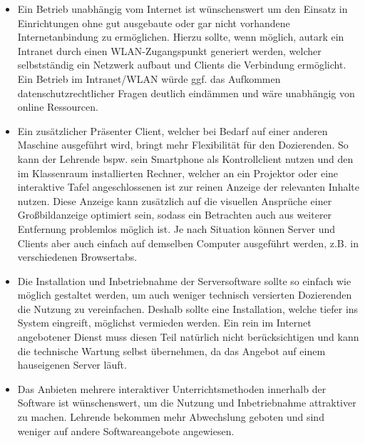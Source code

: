 \begin{itemize}
	\item Ein Betrieb unabhängig vom Internet ist wünschenswert um den Einsatz in Einrichtungen ohne gut ausgebaute oder gar nicht vorhandene Internetanbindung zu ermöglichen. Hierzu sollte, wenn möglich, autark ein Intranet durch einen WLAN-Zugangspunkt generiert werden, welcher selbstständig ein Netzwerk aufbaut und Clients die Verbindung ermöglicht. Ein Betrieb im Intranet/WLAN würde ggf. das Aufkommen datenschutzrechtlicher Fragen deutlich eindämmen und wäre unabhängig von online Ressourcen.
	\item Ein zusätzlicher Präsenter Client, welcher bei Bedarf auf einer anderen Maschine ausgeführt wird, bringt mehr Flexibilität für den Dozierenden. So kann der Lehrende bspw. sein Smartphone als Kontrollclient nutzen und den im Klassenraum installierten Rechner, welcher an ein Projektor oder eine interaktive Tafel angeschlossenen ist zur reinen Anzeige der relevanten Inhalte nutzen. Diese Anzeige kann zusätzlich auf die visuellen Ansprüche einer Großbildanzeige optimiert sein, sodass ein Betrachten auch aus weiterer Entfernung problemlos möglich ist. Je nach Situation können Server und Clients aber auch einfach auf demselben Computer ausgeführt werden, z.B. in verschiedenen Browsertabs. 
	\item Die Installation und Inbetriebnahme der Serversoftware sollte so einfach wie möglich gestaltet werden, um auch weniger technisch versierten Dozierenden die Nutzung zu vereinfachen. Deshalb sollte eine Installation, welche tiefer ins System eingreift, möglichst vermieden werden. Ein rein im Internet angebotener Dienst muss diesen Teil natürlich nicht berücksichtigen und kann die technische Wartung selbst übernehmen, da das Angebot auf einem hauseigenen Server läuft.
	\item Das Anbieten mehrere interaktiver Unterrichtsmethoden innerhalb der Software ist wünschenswert, um die Nutzung und Inbetriebnahme attraktiver zu machen. Lehrende bekommen mehr Abwechslung geboten und sind weniger auf andere Softwareangebote angewiesen.
\end{itemize}






